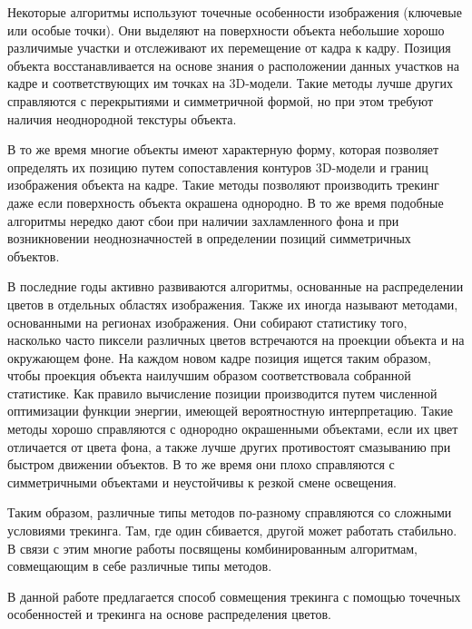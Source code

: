 Некоторые алгоритмы\cite{Vacchetti2004,Lourakis2013,Pauwels2013}
используют точечные особенности изображения (ключевые или особые точки).
Они выделяют на поверхности объекта небольшие хорошо различимые
участки\cite{AKAZE,SIFT,ShiAndTomasi} и отслеживают их перемещение от кадра
к кадру\cite{TomasiAndKanade,SIFT,PyrLK}.
Позиция объекта восстанавливается на основе знания о расположении данных
участков на кадре и соответствующих им точках на 3D-модели\cite{EPnP}.
Такие методы лучше других справляются с перекрытиями и симметричной формой,
но при этом требуют наличия неоднородной текстуры объекта.

В то же время многие объекты имеют характерную форму, которая позволяет
определять их позицию путем сопоставления контуров 3D-модели
и границ\cite{EdgesSurvey,CANNY} изображения объекта на кадре.
Такие методы\cite{RAPID,Marchand2003,Choi2012,Marchand2006,Klein2006,SeoHinterstoisser2014,WangZhong2015,Damen2012,VacchettiEdges2004}
позволяют производить трекинг даже если поверхность объекта окрашена однородно.
В то же время подобные алгоритмы нередко дают сбои при наличии захламленного
фона и при возникновении неоднозначностей в определении позиций
симметричных объектов.

В последние годы активно развиваются алгоритмы, основанные на
распределении цветов в отдельных областях
изображения\cite{PWP3D,Tjaden2017,Tjaden2018}.
Также их иногда называют методами, основанными на регионах изображения.
Они собирают статистику того, насколько часто пиксели различных цветов
встречаются на проекции объекта и на окружающем фоне.
На каждом новом кадре позиция ищется таким образом, чтобы проекция объекта
наилучшим образом соответствовала собранной статистике.
Как правило вычисление позиции производится путем численной оптимизации
функции энергии, имеющей вероятностную интерпретацию.
Такие методы хорошо справляются с однородно окрашенными объектами, если их цвет
отличается от цвета фона, а также лучше других противостоят смазыванию при
быстром движении объектов.
В то же время они плохо справляются с симметричными объектами и неустойчивы к
резкой смене освещения.

Таким образом, различные типы методов по-разному справляются со сложными
условиями трекинга.
Там, где один сбивается, другой может работать стабильно.  В связи с этим
многие работы\cite{RegionPhotometric,ColorFeature2018,Bugaev_2018_ECCV}
посвящены комбинированным алгоритмам, совмещающим в себе различные типы
методов.

В данной работе предлагается способ совмещения трекинга с помощью
точечных особенностей и трекинга на основе распределения цветов.

